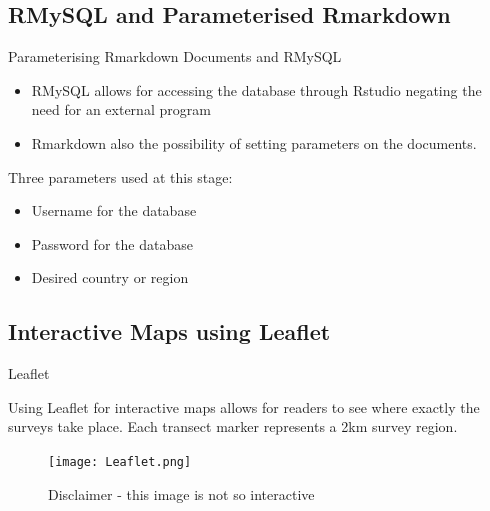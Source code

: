 \documentclass{beamer}
\begin{document}
          \subsection{RMySQL and Parameterised Rmarkdown}
              \begin{frame}{Parameterising Rmarkdown Documents and RMySQL}
                  \begin{itemize}
                    \item RMySQL allows for accessing the database through Rstudio negating the need for an external program
                    \item Rmarkdown also the possibility of setting parameters on the documents.
                  \end{itemize}

                  \medskip

                  Three parameters used at this stage:
                  \begin{itemize}
                    \item Username for the database
                    \item Password for the database
                    \item Desired country or region
                  \end{itemize}
                \end{frame}

          \subsection{Interactive Maps using Leaflet}
              \begin{frame}{Leaflet}

                 Using Leaflet\footnotemark {} for interactive maps allows for readers to see where exactly the surveys take place. Each transect marker represents a 2km survey region.

                  \begin{figure}
                     \centering
                     \texttt{[image: Leaflet.png]}
                     \caption{Disclaimer - this image is not so interactive }
                  \end{figure}
              \end{frame}
\end{document}
